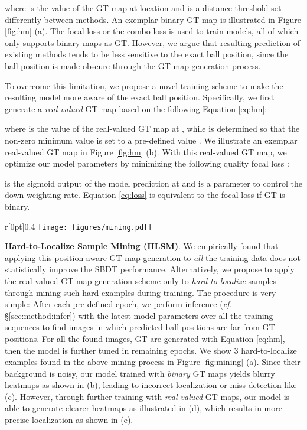\documentclass{bmvc2k}
\begin{document}
where  is the value of the GT map at location  and  is a distance threshold set differently between methods.
An exemplar binary GT map is illustrated in Figure \ref{fig:hm} (a).
The focal loss \cite{lin+2017iccv} or the combo loss \cite{taghanaki+cmig} is used to train models, all of which only supports binary maps as GT.
However, we argue that resulting prediction of existing methods tends to be less sensitive to the exact ball position, since the ball position is made obscure through the GT map generation process.
\par
To overcome this limitation, we propose a novel training scheme to make the resulting model more aware of the exact ball position.
Specifically, we first generate a {\it real-valued} GT map  based on the following Equation \ref{eq:hm}:

where  is the value of the real-valued GT map at , while  is determined so that the non-zero minimum value is set to a pre-defined value .
We illustrate an exemplar real-valued GT map in Figure \ref{fig:hm} (b).
With this real-valued GT map, we optimize our model parameters by minimizing the following quality focal loss \cite{li+2020neurips,li+2020arxiv}:

 is the sigmoid output of the model prediction at  and  is a parameter to control the down-weighting rate.
Equation \ref{eq:loss} is equivalent to the focal loss \cite{lin+2017iccv} if GT is binary.
\par
\vspace{1mm}
\begin{wrapfigure}{r}[0pt]{0.4\textwidth}
\vspace*{-4mm}
\centering
\texttt{[image: figures/mining.pdf]}
\caption{Exemplar hard-to-localize samples found in our HLSM. In (c) and (e), a green circle represents a GT while a red one is a prediction.}
\label{fig:mining}
\end{wrapfigure}
\noindent \textbf{Hard-to-Localize Sample Mining (HLSM)}.
We empirically found that applying this position-aware GT map generation to {\it all} the training data does not statistically improve the SBDT performance.
Alternatively, we propose to apply the real-valued GT map generation scheme only to {\it hard-to-localize} samples through mining such hard examples during training.
The procedure is very simple:
After each pre-defined epoch,
we perform inference ({\it cf.} \S \ref{sec:method:infer}) with the latest model parameters over all the training sequences to find images in which predicted ball positions are far from GT positions.
For all the found images, GT are generated with Equation \ref{eq:hm}, then the model is further tuned in remaining epochs.
We show 3 hard-to-localize examples found in the above mining process in Figure \ref{fig:mining} (a).
Since their background is noisy, our model trained with {\it binary} GT maps yields blurry heatmaps as shown in (b), leading to incorrect localization or miss detection like (c).
However, through further training with {\it real-valued} GT maps, our model is able to generate clearer heatmaps as illustrated in (d), which results in more precise localization as shown in (e).
\end{document}
